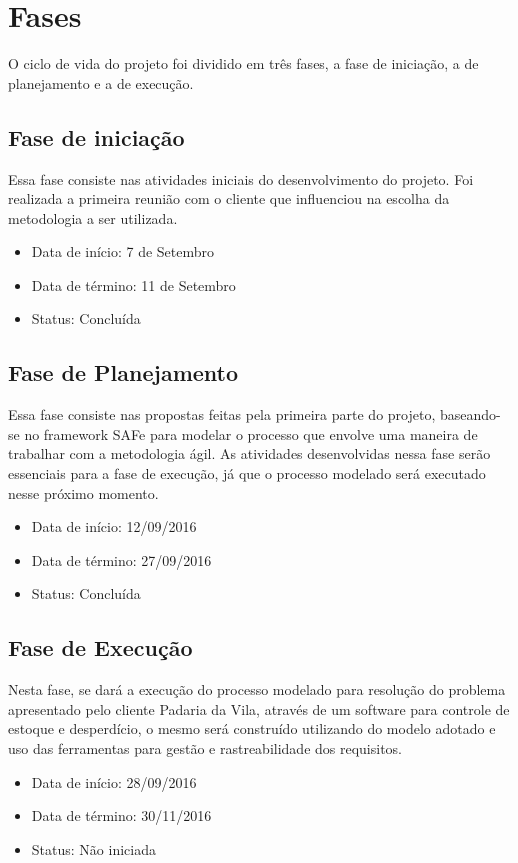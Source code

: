 \section{Fases}
	O ciclo de vida do projeto foi dividido em três fases, a fase de iniciação, a de planejamento e a de execução.

\subsection{Fase de iniciação}
Essa fase consiste nas atividades iniciais do desenvolvimento do projeto. Foi realizada a primeira reunião com o cliente que influenciou na escolha da metodologia a ser utilizada.
\begin{itemize}
\item Data de início: 7 de Setembro
\item Data de término: 11 de Setembro
\item Status: Concluída
\end{itemize}

\subsection{Fase de Planejamento}
Essa fase consiste nas propostas feitas pela primeira parte do projeto, baseando-se no framework SAFe para modelar o processo que envolve uma maneira de trabalhar com a metodologia ágil. As atividades desenvolvidas nessa fase serão essenciais para a fase de execução, já que o processo modelado será executado nesse próximo momento.
\begin{itemize}
\item Data de início: 12/09/2016
\item Data de término: 27/09/2016
\item Status: Concluída
\end{itemize}

\subsection{Fase de Execução}
Nesta fase, se dará a execução do processo modelado para resolução do problema apresentado pelo cliente Padaria da Vila, através de um software para controle de estoque e desperdício, o mesmo será construído utilizando do modelo adotado e uso das ferramentas para gestão e rastreabilidade dos requisitos.
\begin{itemize}
\item Data de início: 28/09/2016
\item Data de término: 30/11/2016
\item Status: Não iniciada
\end{itemize}